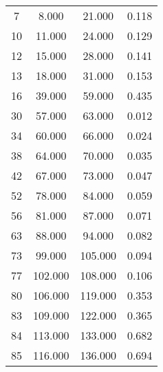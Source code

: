 % 
\begin{tabular}{cccc}
  \hline
  \hline
7 & 8.000 & 21.000 & 0.118 \\ 
  10 & 11.000 & 24.000 & 0.129 \\ 
  12 & 15.000 & 28.000 & 0.141 \\ 
  13 & 18.000 & 31.000 & 0.153 \\ 
  16 & 39.000 & 59.000 & 0.435 \\ 
  30 & 57.000 & 63.000 & 0.012 \\ 
  34 & 60.000 & 66.000 & 0.024 \\ 
  38 & 64.000 & 70.000 & 0.035 \\ 
  42 & 67.000 & 73.000 & 0.047 \\ 
  52 & 78.000 & 84.000 & 0.059 \\ 
  56 & 81.000 & 87.000 & 0.071 \\ 
  63 & 88.000 & 94.000 & 0.082 \\ 
  73 & 99.000 & 105.000 & 0.094 \\ 
  77 & 102.000 & 108.000 & 0.106 \\ 
  80 & 106.000 & 119.000 & 0.353 \\ 
  83 & 109.000 & 122.000 & 0.365 \\ 
  84 & 113.000 & 133.000 & 0.682 \\ 
  85 & 116.000 & 136.000 & 0.694 \\ 
   \hline
\end{tabular}
